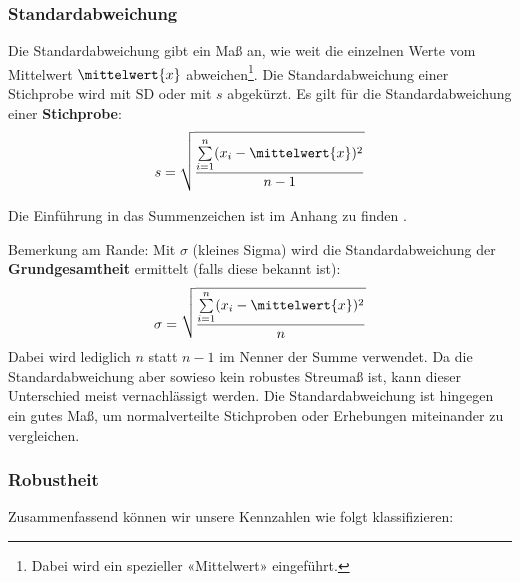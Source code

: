 \subsubsection{Standardabweichung}
Die Standardabweichung gibt ein Maß an, wie weit die einzelnen Werte
vom Mittelwert $\mittelwert{x}$ abweichen\footnote{Dabei wird ein spezieller «Mittelwert»
  eingeführt.}.
Die Standardabweichung einer Stichprobe wird mit $\text{SD}$ oder
mit $s$ abgekürzt. Es gilt für die Standardabweichung einer
\textbf{Stichprobe}:
$$s = \sqrt{\frac{\sum\limits_{i=1}^n(x_i-\mittelwert{x})^2}{n-1}}$$

Die Einführung in das Summenzeichen ist im Anhang zu finden .

Bemerkung am Rande: Mit $\sigma$ (kleines Sigma) wird die
Standardabweichung der \textbf{Grundgesamtheit} ermittelt (falls diese
bekannt ist):
$$\sigma = \sqrt{\frac{\sum\limits_{i=1}^n(x_i-\mittelwert{x})^2}{n}}$$
Dabei wird lediglich $n$ statt $n-1$ im Nenner der Summe verwendet. Da
die Standardabweichung aber sowieso kein robustes Streumaß ist, kann
dieser Unterschied meist vernachlässigt werden. Die Standardabweichung ist hingegen ein gutes Maß, um normalverteilte Stichproben oder Erhebungen miteinander zu vergleichen. 

\newpage
\subsubsection{Robustheit}
Zusammenfassend können wir unsere Kennzahlen wie folgt klassifizieren:

